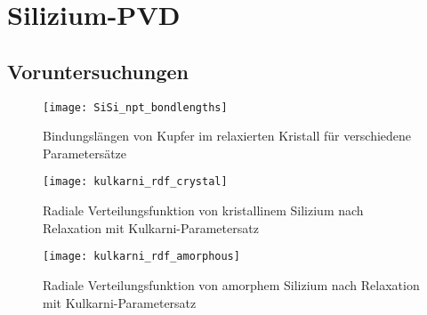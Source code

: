 \chapter{Silizium-PVD}
\label{appendix:silicon}

\section{Voruntersuchungen}

\begin{figure}[h]
  \centering
  \texttt{[image: SiSi\_npt\_bondlengths]}
  \caption[Bindungslängen von Kupfer im relaxierten Kristall für verschiedene Parametersätze]{Bindungslängen von Kupfer im relaxierten Kristall für verschiedene Parametersätze}
  \label{fig:sisibondlengths}
\end{figure}

\begin{figure}[h]
  \centering
  \texttt{[image: kulkarni\_rdf\_crystal]}
  \caption[Radiale Verteilungsfunktion von kristallinem Silizium nach Relaxation mit Kulkarni-Parametersatz]{Radiale Verteilungsfunktion von kristallinem Silizium nach Relaxation mit Kulkarni-Parametersatz}
  \label{fig:kulkarnirdf}
\end{figure}

\begin{figure}[h]
  \centering
  \texttt{[image: kulkarni\_rdf\_amorphous]}
  \caption[Radiale Verteilungsfunktion von amorphem Silizium nach Relaxation mit Kulkarni-Parametersatz]{Radiale Verteilungsfunktion von amorphem Silizium nach Relaxation mit Kulkarni-Parametersatz}
  \label{fig:amorphousrdf}
\end{figure}

